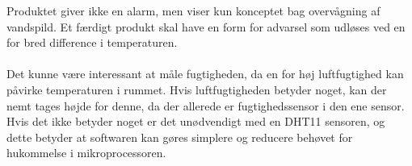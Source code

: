 Produktet giver ikke en alarm, men viser kun konceptet bag overvågning af vandspild. Et færdigt produkt skal have en form for advarsel som udløses ved en for bred difference i temperaturen.
\\
\\
Det kunne være interessant at måle fugtigheden, da en for høj luftfugtighed kan påvirke temperaturen i rummet. Hvis luftfugtigheden betyder noget, kan der nemt tages højde for denne, da der allerede er fugtighedssensor i den ene sensor. Hvis det ikke betyder noget er det unødvendigt med en DHT11 sensoren, og dette betyder at softwaren kan gøres simplere og reducere behøvet for hukommelse i mikroprocessoren.
\\
\\

